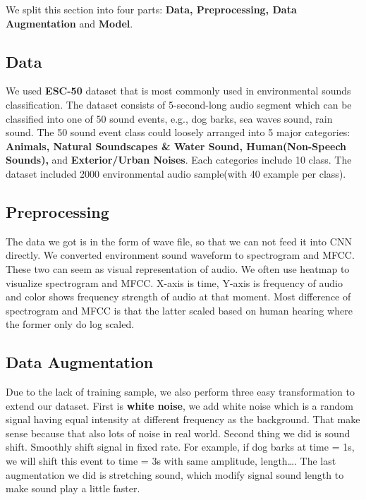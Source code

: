 We split this section into four parts: \textbf{Data, Preprocessing, Data Augmentation} and \textbf{Model}.
\subsection{Data}
We used \textbf{ESC-50} dataset\cite{ESC50} that is most commonly used in environmental sounds classification. The dataset consists of 5-second-long audio segment which can be classified into one of 50 sound events, e.g., dog barks, sea waves sound, rain sound.
The 50 sound event class could loosely arranged into 5 major categories: \textbf{Animals, Natural Soundscapes \& Water Sound, Human(Non-Speech Sounds), }and \textbf{Exterior/Urban Noises}. Each categories include 10 class.
The dataset included 2000 environmental audio sample(with 40 example per class).
\subsection{Preprocessing}\label{pre}
The data we got is in the form of wave file, so that we can not feed it into CNN directly. We converted environment sound waveform to spectrogram and MFCC. 
These two can seem as visual representation of audio. We often use heatmap to visualize spectrogram and MFCC. X-axis is time, Y-axis is frequency of audio and color shows frequency strength of audio at that moment. 
Most difference of spectrogram and MFCC is that the latter scaled based on human hearing where the former only do log scaled.
\begin{comment}
Spectrogram/ MFCC fig. here
\end{comment}

\subsection{Data Augmentation}
Due to the lack of training sample, we also perform three easy transformation to extend our dataset. 
First is \textbf{white noise}, we add white noise which is a random signal having equal intensity at different frequency as the background.
That make sense because that also lots of noise in real world. Second thing we did is sound shift. Smoothly shift signal in fixed rate. For example, if dog barks at time = 1s, we will shift this event to time = 3s with same amplitude, length\ldots. 
The last augmentation we did is stretching sound, which modify signal sound length to make sound play a little faster.
